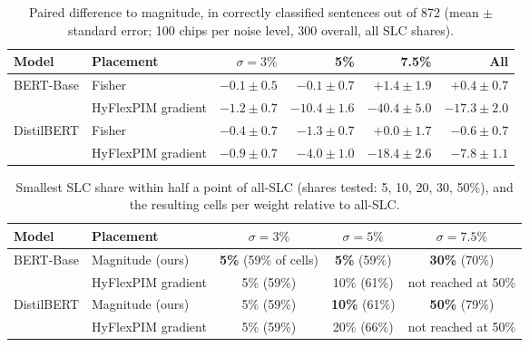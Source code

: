 \documentclass[10pt,a4paper]{article}
\newcommand{\gain}[1]{\textcolor{cmag}{\textbf{#1}}}
\begin{document}
\begin{table}[H]
\centering\small
\caption{Paired difference to magnitude, in correctly classified sentences out of 872 (mean $\pm$ standard
error; 100 chips per noise level, 300 overall, all SLC shares).}\label{t:paired}
\begin{tabular}{@{}llrrrr@{}}
\toprule
Model & Placement & $\sigma=3\%$ & 5\% & 7.5\% & All \\
\midrule
\multirow{2}{*}{BERT-Base} & Fisher & $-0.1\pm0.5$ & $-0.1\pm0.7$ & $+1.4\pm1.9$ & $+0.4\pm0.7$ \\
 & HyFlexPIM gradient & $-1.2\pm0.7$ & $-10.4\pm1.6$ & $-40.4\pm5.0$ & $-17.3\pm2.0$ \\
\midrule
\multirow{2}{*}{DistilBERT} & Fisher & $-0.4\pm0.7$ & $-1.3\pm0.7$ & $+0.0\pm1.7$ & $-0.6\pm0.7$ \\
 & HyFlexPIM gradient & $-0.9\pm0.7$ & $-4.0\pm1.0$ & $-18.4\pm2.6$ & $-7.8\pm1.1$ \\
\bottomrule
\end{tabular}
\end{table}

\begin{table}[H]
\centering\small
\caption{Smallest SLC share within half a point of all-SLC (shares tested: 5, 10, 20, 30, 50\%), and the
resulting cells per weight relative to all-SLC.}\label{t:need}
\begin{tabular}{@{}llccc@{}}
\toprule
Model & Placement & $\sigma=3\%$ & $\sigma=5\%$ & $\sigma=7.5\%$ \\
\midrule
\multirow{2}{*}{BERT-Base} & Magnitude (ours) & \gain{5\%} (59\% of cells) & \gain{5\%} (59\%) & \gain{30\%} (70\%) \\
 & HyFlexPIM gradient & 5\% (59\%) & 10\% (61\%) & not reached at 50\% \\
\midrule
\multirow{2}{*}{DistilBERT} & Magnitude (ours) & 5\% (59\%) & \gain{10\%} (61\%) & \gain{50\%} (79\%) \\
 & HyFlexPIM gradient & 5\% (59\%) & 20\% (66\%) & not reached at 50\% \\
\bottomrule
\end{tabular}
\end{table}
\end{document}
